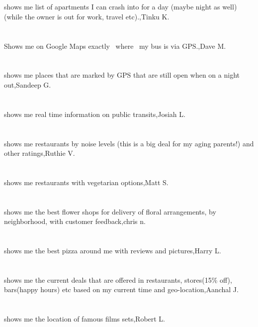 \section{}shows me list of apartments I can crash into for a day (maybe night as well) (while the owner is out for work, travel etc).,Tinku K.
\section{}Shows me on Google Maps exactly ~where~ my bus is via GPS.,Dave M.
\section{}shows me places that are marked by GPS that are still open when on a night out,Sandeep G.
\section{}shows me real time information on public transits,Josiah L.
\section{}shows me restaurants by noise levels (this is a big deal for my aging parents!) and other ratings,Ruthie V.
\section{}shows me restaurants with vegetarian options,Matt S.
\section{} shows me the best flower shops for delivery of floral arrangements, by neighborhood, with customer feedback,chris n.
\section{}shows me the best pizza around me with reviews and pictures,Harry L.
\section{}shows me the current deals that are offered in restaurants, stores(15\% off), bars(happy hours) etc based on my current time and geo-location,Aanchal J.
\section{}shows me the location of famous films sets,Robert L.
